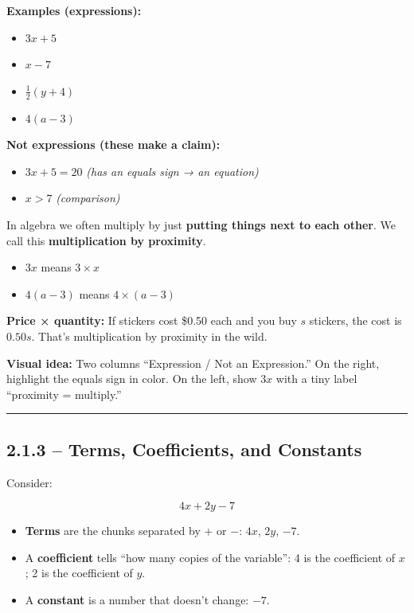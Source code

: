 \documentclass[
  letterpaper,
  DIV=11,
  numbers=noendperiod]{scrreprt}
\providecommand{\tightlist}{%
  \setlength{\itemsep}{0pt}\setlength{\parskip}{0pt}}
\begin{document}
\textbf{Examples (expressions):}

\begin{itemize}
\tightlist
\item
  \(3x + 5\)
\item
  \(x - 7\)
\item
  \(\tfrac{1}{2}(y + 4)\)
\item
  \(4(a - 3)\)
\end{itemize}

\textbf{Not expressions (these make a claim):}

\begin{itemize}
\tightlist
\item
  \(3x + 5 = 20\) \emph{(has an equals sign → an equation)}
\item
  \(x > 7\) \emph{(comparison)}
\end{itemize}

In algebra we often multiply by just \textbf{putting things next to each
other}. We call this \textbf{multiplication by proximity}.

\begin{itemize}
\tightlist
\item
  \(3x\) means \(3 \times x\)
\item
  \(4(a-3)\) means \(4 \times (a-3)\)
\end{itemize}

\textbf{Price × quantity:} If stickers cost \$0.50 each and you buy
\(s\) stickers, the cost is \(0.50s\). That's multiplication by
proximity in the wild.

\textbf{Visual idea:} Two columns ``Expression / Not an Expression.'' On
the right, highlight the equals sign in color. On the left, show \(3x\)
with a tiny label ``proximity = multiply.''

\begin{center}\rule{0.5\linewidth}{0.5pt}\end{center}

\subsection*{2.1.3 -- Terms, Coefficients, and
Constants}\label{terms-coefficients-and-constants}

Consider:

\[
4x + 2y - 7
\]

\begin{itemize}
\tightlist
\item
  \textbf{Terms} are the chunks separated by \(+\) or \(-\): \(4x\),
  \(2y\), \(-7\).
\item
  A \textbf{coefficient} tells ``how many copies of the variable'': 4 is
  the coefficient of \(x\); 2 is the coefficient of \(y\).
\item
  A \textbf{constant} is a number that doesn't change: \(-7\).
\end{itemize}
\end{document}
